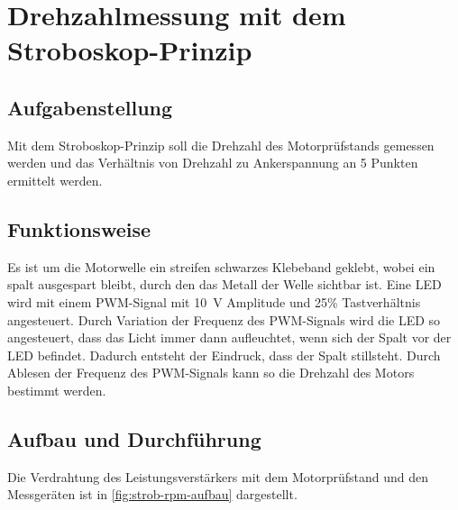 \newpage
\section{Drehzahlmessung mit dem Stroboskop-Prinzip}\label{sec:stroboskop}

\subsection{Aufgabenstellung}

Mit dem Stroboskop-Prinzip soll die Drehzahl des Motorprüfstands gemessen werden und das Verhältnis von Drehzahl zu Ankerspannung an 5 Punkten ermittelt werden.

\subsection{Funktionsweise}

Es ist um die Motorwelle ein streifen schwarzes Klebeband geklebt, wobei ein spalt ausgespart bleibt, durch den das Metall der Welle sichtbar ist. Eine LED wird mit einem PWM-Signal mit \SI{10}{\volt} Amplitude und \num{25}\% Tastverhältnis angesteuert. Durch Variation der Frequenz des PWM-Signals wird die LED so angesteuert, dass das Licht immer dann aufleuchtet, wenn sich der Spalt vor der LED befindet. Dadurch entsteht der Eindruck, dass der Spalt stillsteht. Durch Ablesen der Frequenz des PWM-Signals kann so die Drehzahl des Motors bestimmt werden.

\subsection{Aufbau und Durchführung}

Die Verdrahtung des Leistungsverstärkers mit dem Motorprüfstand und den Messgeräten ist in \autoref{fig:strob-rpm-aufbau} dargestellt.

